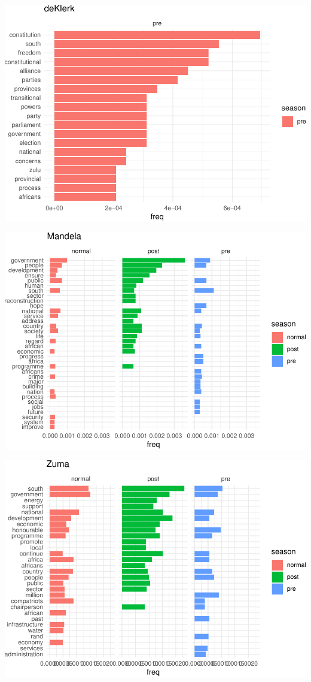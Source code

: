 \documentclass[]{article}
\begin{document}
\begin{center}\includegraphics{datasci_fi_Assignment_2_files/figure-latex/deKlerk -1} \end{center}

\begin{center}\includegraphics{datasci_fi_Assignment_2_files/figure-latex/mandela -1} \end{center}

\begin{center}\includegraphics{datasci_fi_Assignment_2_files/figure-latex/zuma -1} \end{center}
\end{document}
